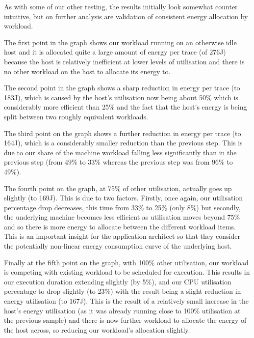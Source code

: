 As with some of our other testing, the results initially look somewhat counter intuitive, but on further analysis are validation of consistent energy allocation by workload.


The first point in the graph shows our workload running on an otherwise idle host and it is allocated quite a large amount of energy per trace (of 276J) because the host is relatively inefficient at lower levels of utilisation and there is no other workload on the host to allocate its energy to.

The second point in the graph shows a sharp reduction in energy per trace (to 183J), which is caused by the host's utilisation now being about 50\% which is considerably more efficient than 25\% and the fact that the host's energy is being split between two roughly equivalent workloads.

The third point on the graph shows a further reduction in energy per trace (to 164J), which is a considerably smaller reduction than the previous step.  This is due to our share of the machine workload falling less significantly than in the previous step (from 49\% to 33\% whereas the previous step was from 96\% to 49\%).

The fourth point on the graph, at 75\% of other utilisation, actually goes up slightly (to 169J).  This is due to two factors.  Firstly, once again, our utilisation percentage drop decreases, this time from 33\% to 25\% (only 8\%) but secondly, the underlying machine becomes less efficient as utilisation moves beyond 75\% and so there is more energy to allocate between the different workload items.  This is an important insight for the application architect so that they consider the potentially non-linear energy consumption curve of the underlying host.

Finally at the fifth point on the graph, with 100\% other utilisation, our workload is competing with existing workload to be scheduled for execution.  This results in our execution duration extending slightly (by 5\%), and our CPU utilisation percentage to drop slightly (to 23\%) with the result being a slight reduction in energy utilisation (to 167J).  This is the result of a relatively small increase in the host's energy utilisation (as it was already running close to 100\% utilisation at the previous sample) and there is now further workload to allocate the energy of the host across, so reducing our workload's allocation slightly.

